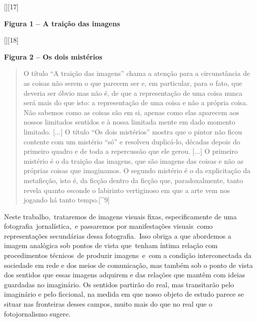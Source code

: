 \documentclass[
  letterpaper,
]{abntex2}
\begin{document}
{[}{]}{[}17{]}

\protect\hypertarget{_Toc507740886}{}{}\textbf{Figura 1 -- A traição das
imagens}

{[}{]}{[}18{]}

\protect\hypertarget{_Toc507740887}{}{}\textbf{Figura 2 -- Os dois
mistérios}

\begin{quote}
O título ``A traição das imagens'' chama a atenção para a circunstância
de as coisas não serem o que parecem ser e, em particular, para o fato,
que deveria ser óbvio mas não é, de que a representação de uma coisa
nunca será mais do que isto: a representação de uma coisa e não a
própria coisa. Não sabemos como as coisas são em si, apenas como elas
aparecem aos nossos limitados sentidos e à nossa limitada mente em dado
momento limitado. {[}...{]} O título ``Os dois mistérios'' mostra que o
pintor não ficou contente com um mistério ``só'' e resolveu duplicá-lo,
décadas depois do primeiro quadro e de toda a repercussão que ele gerou.
{[}...{]} O primeiro mistério é o da traição das imagens, que são
imagens das coisas e não as próprias coisas que imaginamos. O segundo
mistério é o da explicitação da metaficção, isto é, da ficção dentro da
ficção que, paradoxalmente, tanto revela quanto esconde o labirinto
vertiginoso em que a arte vem nos jogando há tanto tempo.{[}\^{}9{]}
\end{quote}

Neste trabalho,~trataremos de imagens visuais fixas, especificamente de
uma fotografia~jornalística,~e passaremos por manifestações visuais~como
representações secundárias dessa fotografia.~Isso obriga a que abordemos
a imagem analógica sob pontos de vista que~tenham íntima relação com
procedimentos técnicos~de produzir imagens~e~com a condição
interconectada da sociedade em rede e dos meios de comunicação, mas
também sob o ponto de vista dos sentidos que essas imagens adquirem e
das relações que mantêm com ideias guardadas no imaginário. Os sentidos
partirão do real, mas transitarão pelo imaginário e pelo ficcional, na
medida em que nosso objeto de estudo parece se situar nas fronteiras
desses campos, muito mais do que no real que o fotojornalismo sugere.
\end{document}

